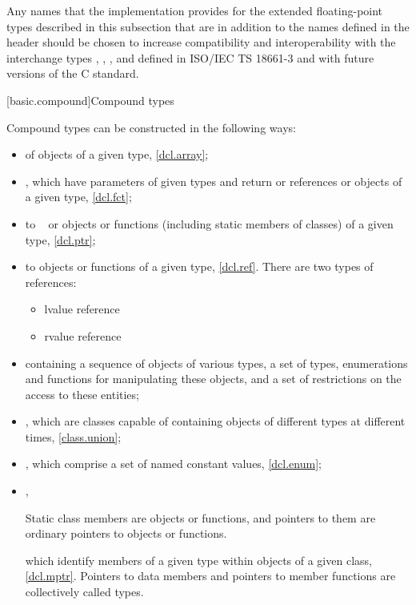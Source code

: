 \pnum
\recommended
Any names that the implementation provides for
the extended floating-point types described in this subsection
that are in addition to the names defined in the  header
should be chosen to increase compatibility and interoperability
with the interchange types
, , , and 
defined in ISO/IEC TS 18661-3 and with future versions of the C standard.

[basic.compound]{Compound types}

\pnum
{}%
Compound types can be constructed in the following ways:
\begin{itemize}
\item {} of objects of a given type, \ref{dcl.array};

\item {}, which have parameters of given types and return
 or references or objects of a given type, \ref{dcl.fct};

\item {} to \cv{}~ or objects or functions (including
static members of classes) of a given type, \ref{dcl.ptr};

\item
{}%
%
 to objects or functions of a given
type, \ref{dcl.ref}. There are two types of references:
\begin{itemize}
\item lvalue reference
\item rvalue reference
\end{itemize}

\item
{} containing a sequence of objects of various types,
a set of types, enumerations and functions for
manipulating these objects, and a set of restrictions
on the access to these entities;

\item
{}, which are classes capable of containing objects of
different types at different times, \ref{class.union};

\item
{},
which comprise a set of named constant values, \ref{dcl.enum};

\item
{}%
,%
\begin{footnote}
Static class members are objects or functions, and pointers to them are
ordinary pointers to objects or functions.
\end{footnote}
which identify members of a given
type within objects of a given class, \ref{dcl.mptr}.
Pointers to data members and pointers to member functions are collectively
called  types.
\end{itemize}


